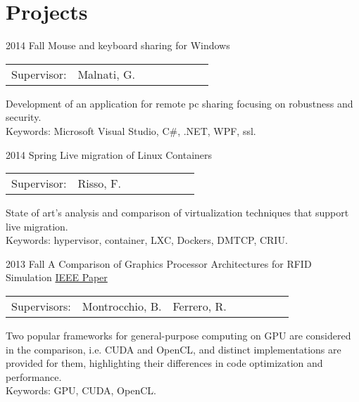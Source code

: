 \documentclass[]{cv}
\newcommand{\vcenteredinclude}[1]{\begingroup
\setbox0=\hbox{\texttt{[image: \#1]}}%
\parbox{\wd0}{\box0}\endgroup}
\begin{document}

\framebreak

\section{Projects}
\begin{entrylistlogodated}
   \entrydated
       {2014 Fall}
       {Mouse and keyboard sharing for Windows}
       {}
       {
         \begin{tabularx}{\textwidth}{XXXXXXXX}
           Supervisor: & Malnati, G. & & & & & & \tabularnewline
         \end{tabularx}
         Development of an application for remote pc sharing focusing
         on robustness and security.\\
         Keywords: Microsoft Visual Studio, C\#, .NET, WPF, ssl.
       }
  \entrydated
      {2014 Spring}
      {Live migration of Linux Containers}
      {}
      {
        \begin{tabularx}{\textwidth}{XXXXXXXX}
          Supervisor: & Risso, F. & & & & & & \tabularnewline
        \end{tabularx}
        State of art's analysis and comparison of virtualization
techniques that support live migration.\\
        Keywords: hypervisor, container, LXC, Dockers, DMTCP, CRIU.  }
  \entrydated
      {2013 Fall}
      {A Comparison of Graphics Processor Architectures for RFID Simulation}
      {\href{http://ieeexplore.ieee.org/xpl/articleDetails.jsp?arnumber=7023928}{IEEE Paper}}
      {
        \begin{tabularx}{\textwidth}{XXXXXXXX}
          Supervisors: & Montrocchio, B. & Ferrero, R. & & & & \tabularnewline
        \end{tabularx}
        Two popular frameworks for general-purpose computing on GPU
        are considered in the comparison, i.e. CUDA and OpenCL, and
        distinct implementations are provided for them, highlighting
        their differences in code optimization and performance.\\
        Keywords: GPU, CUDA, OpenCL.  }
\end{entrylistlogodated}
\end{document}

